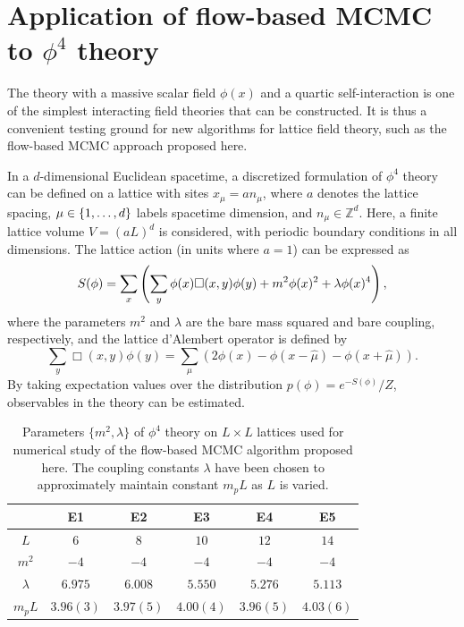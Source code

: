 \section{Application of flow-based MCMC to $\phi^4$ theory}
\label{sec:phi4}

The theory with a massive scalar field $\phi(x)$ and a quartic self-interaction is one of the simplest interacting field theories that can be constructed. It is thus a convenient testing ground for new algorithms for lattice field theory, such as the flow-based MCMC approach proposed here.

In a $d$-dimensional Euclidean spacetime, a discretized formulation of $\phi^4$ theory can be defined on a lattice with sites $x_\mu = a n_\mu$, where $a$ denotes the lattice spacing, $\mu \in \left\{ 1, \dots, d \right\}$ labels spacetime dimension, and $n_\mu \in \mathbb{Z}^d$. Here, a finite lattice volume $V=(aL)^d$ is considered, with periodic boundary conditions in all dimensions. The lattice action (in units where $a=1$) can be expressed as
%
\begin{equation}\small
    S(\phi) = \sum_{x} \left( \sum_y\phi(x)\Box(x,y)\phi(y) + m^2\phi(x)^2 + \lambda \phi(x)^4\right),
\end{equation}
%
where the parameters $m^2$ and $\lambda$ are the bare mass squared and bare coupling, respectively, and the lattice d'Alembert operator is defined by
%
\begin{equation}
    \sum_y\Box(x,y)\phi(y) = \sum_\mu \left(2\phi(x) -\phi({x-\hat{\mu}}) - \phi({x+\hat{\mu}})\right).
\end{equation}
%
By taking expectation values over the distribution $p(\phi) = e^{-S(\phi)}/Z$, observables in the theory can be estimated.
%

\begin{table}[h]
    \centering
    \begin{tabular}{c|ccccc}\hline\hline
    & E1 & E2 & E3 & E4 & E5\\\hline
         $L$ & $6$ & $8$ & $10$ & $12$ & $14$ \\
         $m^2$ & $-4$ & $-4$ & $-4$ & $-4$ & $-4$ \\
         $\lambda$ & $6.975$ & $6.008$ & $5.550$ & $5.276$ & $5.113$ \\
         $m_p L$ & $3.96(3)$ & $3.97(5)$ & $4.00(4)$ & $3.96(5)$ & $4.03(6)$ \\\hline\hline
    \end{tabular}
    \caption{Parameters $\{m^2,\lambda\}$ of $\phi^4$ theory on $L\times L$ lattices used for numerical study of the flow-based MCMC algorithm proposed here. The coupling constants $\lambda$ have been chosen to approximately maintain constant $m_pL$ as $L$ is varied.}
    \label{tab:lattice-params}
\end{table}

